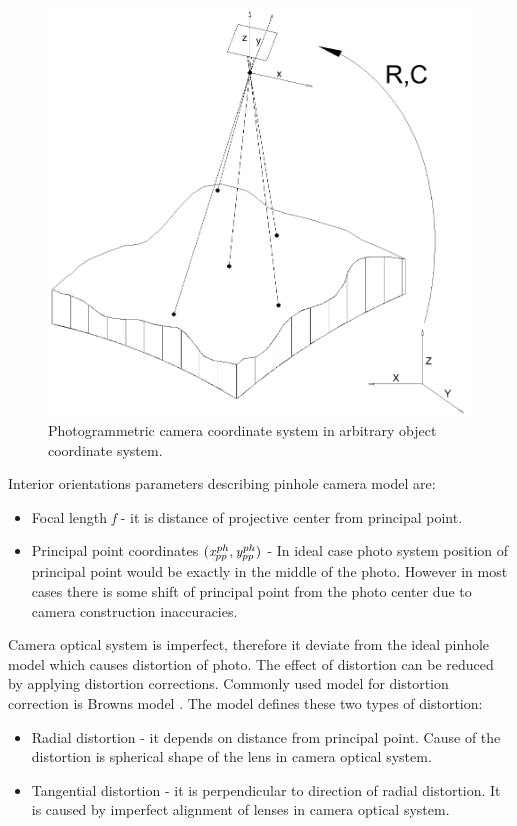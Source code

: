 \documentclass[a4paper,12pt]{article}
\newcommand{\escal}[1]{
{\it #1}
}
\begin{document}
\begin{figure}[h]
    \centering
    \includegraphics[scale=0.3]{figures/photogrammetric_model.png}
    \caption{Photogrammetric camera coordinate system in arbitrary object coordinate system.}
    \label{fig:ph_model}
\end{figure}

Interior orientations parameters describing pinhole camera model are:
\begin{itemize}
  \item Focal length \escal{f} - it is distance of projective center from principal point.
  \item Principal point coordinates $(\escal{x}^{ph}_{pp}, \escal{y}^{ph}_{pp})$ - In ideal case photo system position of principal point would be exactly in the middle 
	of the photo.  However in most cases there is some shift of principal point from the photo center due to
	camera construction inaccuracies.
\end{itemize}

Camera optical system is imperfect, therefore it deviate from the ideal pinhole model which 
 causes distortion of photo.
The effect of distortion can be reduced by applying distortion corrections. Commonly 
used model for distortion correction is Browns model \cite{brown1966distortion}.
The model defines these two types of distortion:
\begin{itemize}
  \item Radial distortion - it depends on distance from principal point. Cause of the distortion is spherical shape of the 
  lens in camera optical system.
  \item Tangential distortion - it is perpendicular to direction of radial distortion. It is caused by 
       imperfect alignment of lenses in camera optical system.
\end{itemize}
\end{document}
